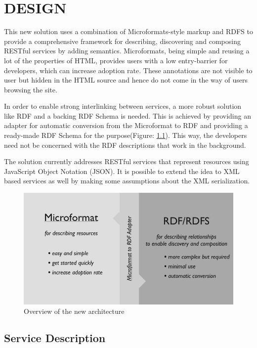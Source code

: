 \chapter{DESIGN}
\begin{spacing}{1.5}
This new solution uses a combination of Microformats-style markup and RDFS to provide a comprehensive framework for describing, discovering and composing RESTful services by adding semantics. Microformats, being simple and reusing a lot of the properties of HTML, provides users with a low entry-barrier for developers, which can increase adoption rate. These annotations are not visible to user but hidden in the HTML source and hence do not come in the way of users browsing the site.

In order to enable strong interlinking between services, a more robust solution like RDF and a backing RDF Schema is needed. This is achieved by providing an adapter for automatic conversion from the Microformat to RDF and providing a ready-made RDF Schema for the purpose(Figure: \ref{fig:micro_vs_rdf}). This way, the developers need not be concerned with the RDF descriptions that work in the background.

The solution currently addresses RESTful services that represent resources using JavaScript Object Notation (JSON). It is possible to extend the idea to XML based services as well by making some assumptions about the XML serialization.

\begin{figure}
        \centering
        \includegraphics[scale=0.3]{images/micro_vs_rdf.png}
        \caption{Overview of the new architecture }
        \label{fig:micro_vs_rdf}
\end{figure}


\section{Service Description}


\end{spacing}
